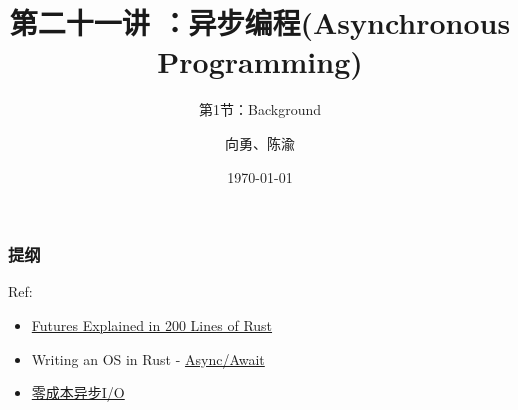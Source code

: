 


\title[第21讲]{第二十一讲 ：异步编程(Asynchronous Programming)} %
\subtitle{第1节：Background}
\author{向勇、陈渝} %
\date{\today} %



\begin{frame}
\titlepage %
\end{frame}

\begin{frame}
\frametitle{提纲} %
\tableofcontents %
Ref:
    \begin{itemize}
        \item \href{https://cfsamson.github.io/books-futures-explained/}{Futures Explained in 200 Lines of Rust}
        \item Writing an OS in Rust - \href{https://os.phil-opp.com/async-await/}{Async/Await}
        \item \href{https://zhuanlan.zhihu.com/p/97574385}{零成本异步I/O}
    \end{itemize}

\end{frame}
% 
% 
